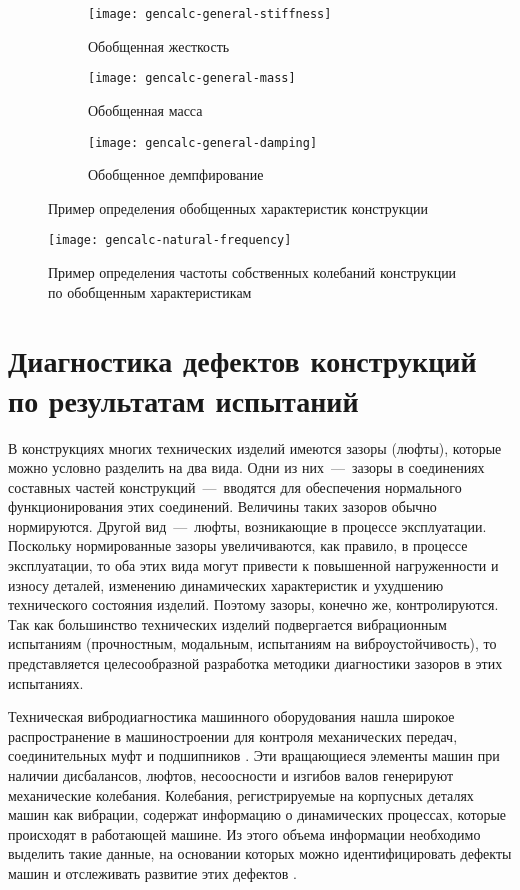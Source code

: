 \begin{figure}[H]
	\centering
	\begin{subfigure}{0.49\textwidth}
		\texttt{[image: gencalc-general-stiffness]} 
		\caption{Обобщенная жесткость}
	\end{subfigure}
	\hfill
	\begin{subfigure}{0.49\textwidth}
		\texttt{[image: gencalc-general-mass]} 
		\caption{Обобщенная масса}
	\end{subfigure}
	\begin{subfigure}{0.49\textwidth}
		\texttt{[image: gencalc-general-damping]} 
		\caption{Обобщенное демпфирование}
	\end{subfigure}
     \caption{Пример определения обобщенных характеристик конструкции} \label{fig:gencalc-general-params}
\end{figure}

\begin{figure}[H]
	\centering
	\texttt{[image: gencalc-natural-frequency]}
	\caption{Пример определения частоты собственных колебаний конструкции по обобщенным характеристикам} \label{fig:gencalc-natural-frequency}
\end{figure}

\section{Диагностика дефектов конструкций по результатам испытаний}

В конструкциях многих технических изделий имеются зазоры (люфты), которые можно условно разделить на два вида. Одни из них~---~зазоры в соединениях составных частей конструкций~---~вводятся для обеспечения нормального функционирования этих соединений. Величины таких зазоров обычно нормируются. Другой вид~---~люфты, возникающие в процессе эксплуатации. Поскольку нормированные зазоры увеличиваются, как правило, в процессе эксплуатации, то оба этих вида могут привести к повышенной нагруженности и износу деталей, изменению динамических характеристик и ухудшению технического состояния изделий. Поэтому зазоры, конечно же, контролируются. Так как большинство технических изделий подвергается вибрационным испытаниям (прочностным, модальным, испытаниям на виброустойчивость), то представляется целесообразной разработка методики диагностики зазоров в этих испытаниях. 

Техническая вибродиагностика машинного оборудования нашла широкое распространение в машиностроении для контроля механических передач, соединительных муфт и подшипников \cite{lib:defects:Tiwari, lib:defects:Bachschmid, lib:defects:Kostjukov, lib:defects:Balickij, lib:defects:Zhukov}. Эти вращающиеся элементы машин при наличии дисбалансов, люфтов, несоосности и изгибов валов генерируют механические колебания. Колебания, регистрируемые на корпусных деталях машин как вибрации, содержат информацию о динамических процессах, которые происходят в работающей машине. Из этого объема информации необходимо выделить такие данные, на основании которых можно идентифицировать дефекты машин и отслеживать развитие этих дефектов \cite{lib:defects:Zhuge, lib:defects:Lacey, lib:defects:Litak}.

